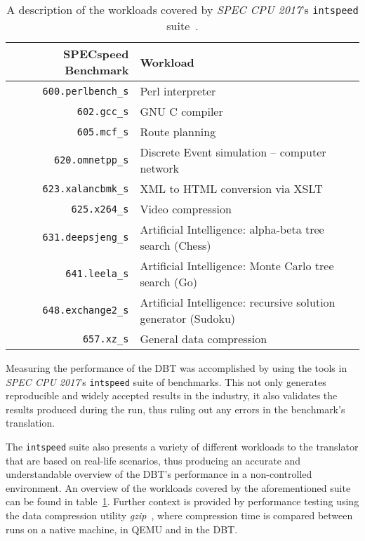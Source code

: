 \begin{table}
	\centering
	\begin{tabular}{rl}
		\toprule
		\textbf{SPECspeed Benchmark} & \textbf{Workload}\\
		\midrule
		\texttt{600.perlbench\_s} & Perl interpreter\\
		\texttt{602.gcc\_s} & GNU C compiler\\
		\texttt{605.mcf\_s} & Route planning\\
		\texttt{620.omnetpp\_s} & Discrete Event simulation -- computer network\\
		\texttt{623.xalancbmk\_s} & XML to HTML conversion via XSLT\\
		\texttt{625.x264\_s} & Video compression\\
		\texttt{631.deepsjeng\_s} & Artificial Intelligence: alpha-beta tree search (Chess)\\
		\texttt{641.leela\_s} & Artificial Intelligence: Monte Carlo tree search (Go)\\
		\texttt{648.exchange2\_s} & Artificial Intelligence: recursive solution generator (Sudoku)\\
		\texttt{657.xz\_s} & General data compression\\
		\bottomrule
	\end{tabular}
	\caption[SPEC CPU 2017 workload description]%
	{A description of the workloads covered by \textit{SPEC CPU 2017}'s \texttt{intspeed} suite~\cite{spec-cpu-doc}.}
	\label{tab:spec-description}
\end{table}


Measuring the performance of the DBT was accomplished by using the tools in \textit{SPEC CPU 2017}'s \texttt{intspeed} suite of benchmarks.
This not only generates reproducible and widely accepted results in the industry, it also validates the results produced during the run, thus ruling out any errors in the benchmark's translation.

The \texttt{intspeed} suite also presents a variety of different workloads to the translator that are based on real-life scenarios, thus producing an accurate and understandable overview of the DBT's performance in a non-controlled environment.
An overview of the workloads covered by the aforementioned suite can be found in table~\ref{tab:spec-description}.
Further context is provided by performance testing using the data compression utility \textit{gzip}~\cite{gzip}, where compression time is compared between runs on a native machine, in QEMU and in the DBT\@.

